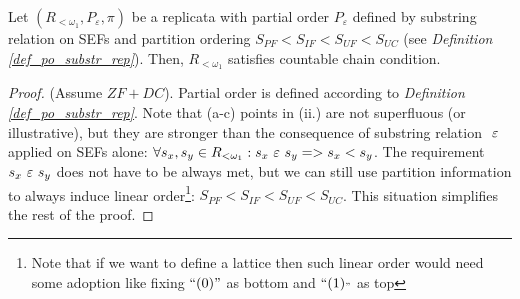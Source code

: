 \begin{theorem}\label{theorem_rw_ccc}
  Let $(R_{<\omega_1}, P_{\varepsilon}, \pi)$ be a replicata with partial order $P_{\varepsilon}$ defined by substring relation on SEFs and partition ordering $S_{PF} < S_{IF} < S_{UF} < S_{UC}$ (see \textit{Definition \ref{def_po_substr_rep}}).
  Then, $R_{<\omega_1}$ satisfies countable chain condition.
\end{theorem}
\begin{proof}
  (Assume $ZF+DC$). Partial order is defined according to \textit{Definition \ref{def_po_substr_rep}}. Note that (a-c) points in (ii.) are not superfluous (or illustrative), but they are stronger than the consequence of substring relation $\ \varepsilon\ $ applied on SEFs alone: $\forall s_x,s_y \in R_{<\omega_1}: s_x \ \varepsilon\  s_y => s_x < s_y$. The requirement $s_x \ \varepsilon\  s_y$ does not have to be always met, but we can still use partition information to always induce linear order\footnote{Note that if we want to define a lattice then such linear order would need some adoption like fixing $\text{``}(0)\text{''}$ as bottom and $\text{``}(1)_{\text{''}}$ as top}: $S_{PF} < S_{IF} < S_{UF} < S_{UC}$. This situation simplifies the rest of the proof.


\end{proof}
